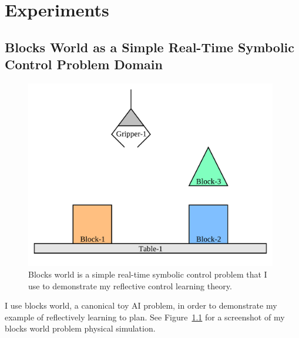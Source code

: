 \chapter{Experiments}\label{ch:experiments}

\section{Blocks World as a Simple Real-Time Symbolic Control Problem Domain}

\begin{figure}[bth]
  \center
  \includegraphics[width=11cm]{gfx/blocks_world_screenshot-1}
  \caption[Blocks world is a simple real-time symbolic control problem]{Blocks world is a simple real-time symbolic control problem that I use to demonstrate my reflective control learning theory.}
  \label{fig:blocks_world_screenshot-1}
\end{figure}

I use blocks world, a canonical toy AI problem, in order to demonstrate my example of reflectively learning to plan.
See Figure~\ref{fig:blocks_world_screenshot-1} for a screenshot of my blocks world problem physical simulation.

